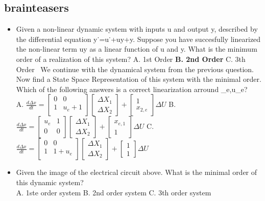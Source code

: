\documentclass{document}
\begin{document}
		\subsection{brainteasers}
		\begin{itemize}
			\item Given a non-linear dynamic system with inputs u and output y, described by the differential equation y˙=u˙+uy+y. Suppose you have succesfully linearized the non-linear term uy as a linear function of u and y. What is the minimum order of a realization of this system?
			A. 1st Order
			\textbf{B. 2nd Order}
			C. 3th Order
			\ We continue with the dynamical system from the previous question. Now find a State Space Representation of this system with the minimal order. Which of the following answers is a correct linearization arround _e,u_e?\\
			A. $\frac{d \Delta x}{dt} = \begin{bmatrix} 0 & 0 \\ 1 & u_e + 1 \\ \end{bmatrix} \begin{bmatrix} \Delta X _1 \\ \Delta X_2 \end{bmatrix} + \begin{bmatrix} 1 \\ x_{2,e} \end{bmatrix} \Delta U$
			B. $\frac{d \Delta x}{dt} = \begin{bmatrix} u_e & 1 \\0 & 0 \\ \end{bmatrix} \begin{bmatrix} \Delta X _1 \\ \Delta X_2 \end{bmatrix} + \begin{bmatrix} x_{e,1} \\ 1 \end{bmatrix} \Delta U $
			C.$\frac{d \Delta x}{dt} = \begin{bmatrix} 0 & 0 \\ 1 & 1 + u_e\\ \end{bmatrix} \begin{bmatrix} \Delta X _1 \\ \Delta X_2 \end{bmatrix} + \begin{bmatrix} 1 \\ 1 \end{bmatrix} \Delta U$
			\item Given the image of the electrical circuit above. What is the minimal order of this dynamic system?\\
			A. 1ste order system
			B. 2nd order system
			C. 3th order system
		\end{itemize}
\end{document}

